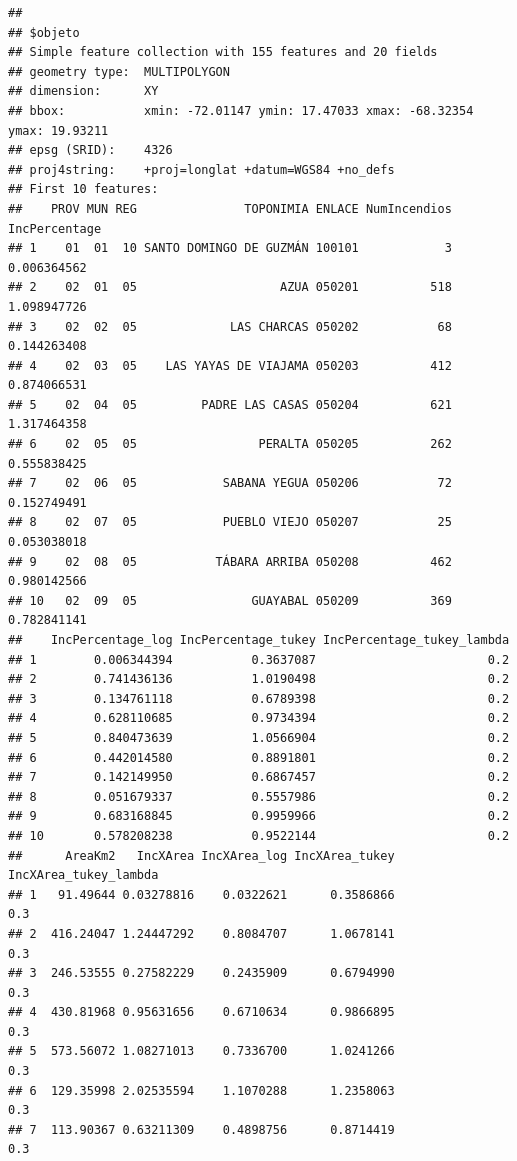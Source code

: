 \documentclass[11pt,]{article}
\begin{document}
\begin{verbatim}
## 
## $objeto
## Simple feature collection with 155 features and 20 fields
## geometry type:  MULTIPOLYGON
## dimension:      XY
## bbox:           xmin: -72.01147 ymin: 17.47033 xmax: -68.32354 ymax: 19.93211
## epsg (SRID):    4326
## proj4string:    +proj=longlat +datum=WGS84 +no_defs
## First 10 features:
##    PROV MUN REG               TOPONIMIA ENLACE NumIncendios IncPercentage
## 1    01  01  10 SANTO DOMINGO DE GUZMÁN 100101            3   0.006364562
## 2    02  01  05                    AZUA 050201          518   1.098947726
## 3    02  02  05             LAS CHARCAS 050202           68   0.144263408
## 4    02  03  05    LAS YAYAS DE VIAJAMA 050203          412   0.874066531
## 5    02  04  05         PADRE LAS CASAS 050204          621   1.317464358
## 6    02  05  05                 PERALTA 050205          262   0.555838425
## 7    02  06  05            SABANA YEGUA 050206           72   0.152749491
## 8    02  07  05            PUEBLO VIEJO 050207           25   0.053038018
## 9    02  08  05           TÁBARA ARRIBA 050208          462   0.980142566
## 10   02  09  05                GUAYABAL 050209          369   0.782841141
##    IncPercentage_log IncPercentage_tukey IncPercentage_tukey_lambda
## 1        0.006344394           0.3637087                        0.2
## 2        0.741436136           1.0190498                        0.2
## 3        0.134761118           0.6789398                        0.2
## 4        0.628110685           0.9734394                        0.2
## 5        0.840473639           1.0566904                        0.2
## 6        0.442014580           0.8891801                        0.2
## 7        0.142149950           0.6867457                        0.2
## 8        0.051679337           0.5557986                        0.2
## 9        0.683168845           0.9959966                        0.2
## 10       0.578208238           0.9522144                        0.2
##      AreaKm2   IncXArea IncXArea_log IncXArea_tukey IncXArea_tukey_lambda
## 1   91.49644 0.03278816    0.0322621      0.3586866                   0.3
## 2  416.24047 1.24447292    0.8084707      1.0678141                   0.3
## 3  246.53555 0.27582229    0.2435909      0.6794990                   0.3
## 4  430.81968 0.95631656    0.6710634      0.9866895                   0.3
## 5  573.56072 1.08271013    0.7336700      1.0241266                   0.3
## 6  129.35998 2.02535594    1.1070288      1.2358063                   0.3
## 7  113.90367 0.63211309    0.4898756      0.8714419                   0.3

\end{verbatim}
\end{document}
